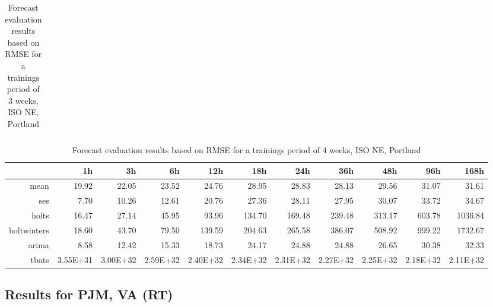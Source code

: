 \begin{landscape}
\begin{table}[ht]
\begin{tabular}{rrrrrrrrrrr}
   \hline
\end{tabular}
\caption{Forecast evaluation results based on RMSE for a trainings period of 3 weeks, ISO NE, Portland}
\label{tab:app_results_portland_3weeks}
\end{table}
\begin{table}[ht]
\centering
\begin{tabular}{rrrrrrrrrrr}
  \hline
 & 1h & 3h & 6h & 12h & 18h & 24h & 36h & 48h & 96h & 168h \\ 
  \hline
mean & 19.92 & 22.05 & 23.52 & 24.76 & 28.95 & 28.83 & 28.13 & 29.56 & 31.07 & 31.61 \\ 
  ses & 7.70 & 10.26 & 12.61 & 20.76 & 27.36 & 28.11 & 27.95 & 30.07 & 33.72 & 34.67 \\ 
  holts & 16.47 & 27.14 & 45.95 & 93.96 & 134.70 & 169.48 & 239.48 & 313.17 & 603.78 & 1036.84 \\ 
  holtwinters & 18.60 & 43.70 & 79.50 & 139.59 & 204.63 & 265.58 & 386.07 & 508.92 & 999.22 & 1732.67 \\ 
  arima & 8.58 & 12.42 & 15.33 & 18.73 & 24.17 & 24.88 & 24.88 & 26.65 & 30.38 & 32.33 \\ 
  tbats & 3.55E+31 & 3.00E+32 & 2.59E+32 & 2.40E+32 & 2.34E+32 & 2.31E+32 & 2.27E+32 & 2.25E+32 & 2.18E+32 & 2.11E+32 \\ 
   \hline
\end{tabular}
\caption{Forecast evaluation results based on RMSE for a trainings period of 4 weeks, ISO NE, Portland}
\label{tab:app_results_portland_4weeks}
\vspace*{-0.4in}
\end{table}




\subsection{Results for PJM, VA (RT)}




\end{landscape}
